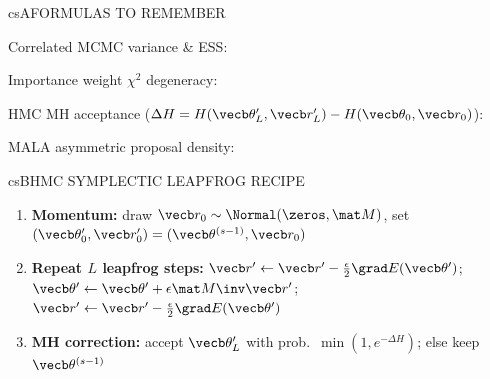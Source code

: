 \documentclass[../../../../master.tex]{subfiles}
\begin{document}

\csnextpage

\begin{cscolumns}
\begin{cscard}{csA}{FORMULAS TO REMEMBER}
  \begin{csbul}
    \item Correlated MCMC variance \& ESS:
    \item Importance weight $\chi^2$ degeneracy:
    \item HMC MH acceptance ($\Delta H = H(\vecb\theta'_L,\vecb r'_L)-H(\vecb\theta_0,\vecb r_0)$):
    \item MALA asymmetric proposal density:
  \end{csbul}
\end{cscard}

\begin{cscard}{csB}{HMC SYMPLECTIC LEAPFROG RECIPE}
  \begin{enumerate}[leftmargin=1.2em, itemsep=1pt, topsep=1pt, parsep=0pt]
    \item \textbf{Momentum:} draw $\vecb r_0\sim\Normal(\zeros,\mat M)$, set $(\vecb\theta'_0,\vecb r'_0)=(\vecb\theta^{(s-1)},\vecb r_0)$
    \item \textbf{Repeat $L$ leapfrog steps:}
      $\vecb r'\gets\vecb r'-\tfrac{\epsilon}{2}\grad E(\vecb\theta')$;\;
      $\vecb\theta'\gets\vecb\theta'+\epsilon\mat M\inv\vecb r'$;\;
      $\vecb r'\gets\vecb r'-\tfrac{\epsilon}{2}\grad E(\vecb\theta')$
    \item \textbf{MH correction:} accept $\vecb\theta'_L$ with prob.\ $\min(1,e^{-\Delta H})$; else keep $\vecb\theta^{(s-1)}$
  \end{enumerate}
\end{cscard}
\columnbreak


\end{cscolumns}
\end{document}
